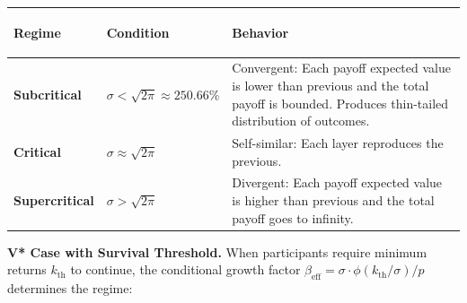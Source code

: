 \documentclass[
  11pt,
  openany]{article}
\newcounter{none} %
\begin{document}
{\def\LTcaptype{none} %
\begin{longtable}[]{@{}
  >{\raggedright\arraybackslash}p{}
  >{\raggedright\arraybackslash}p{}
  >{\raggedright\arraybackslash}p{}@{}}
\toprule\noalign{}
\begin{minipage}[b]{\linewidth}\raggedright
{\bfseries 

Regime

}
\end{minipage} & \begin{minipage}[b]{\linewidth}\raggedright
{\bfseries 

Condition

}
\end{minipage} & \begin{minipage}[b]{\linewidth}\raggedright
{\bfseries 

Behavior

}
\end{minipage} \\
\midrule\noalign{}
\endhead
\bottomrule\noalign{}
\endlastfoot
\textbf{Subcritical} & \(\sigma < \sqrt{2\pi} \approx 250.66\%\) &
Convergent: Each payoff expected value is lower than previous and the
total payoff is bounded. Produces thin-tailed distribution of
outcomes. \\
\textbf{Critical} & \(\sigma \approx \sqrt{2\pi}\) & Self-similar: Each
layer reproduces the previous. \\
\textbf{Supercritical} & \(\sigma > \sqrt{2\pi}\) & Divergent: Each
payoff expected value is higher than previous and the total payoff goes
to infinity. \\
\end{longtable}
}

\textbf{V* Case with Survival Threshold.} When participants require
minimum returns \(k_{\text{th}}\) to continue, the conditional growth
factor
\(\beta_{\text{eff}} = \sigma \cdot \phi(k_{\text{th}}/\sigma)/p\)
determines the regime:
\end{document}
